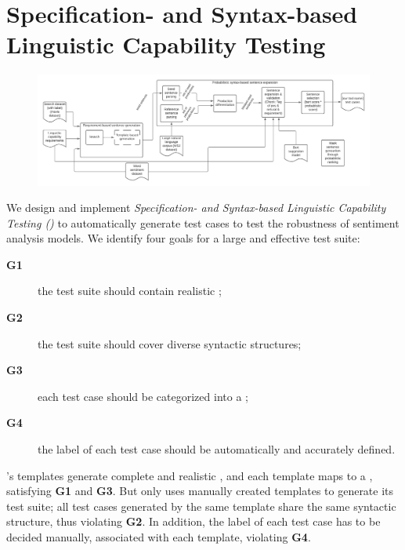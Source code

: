 \section{Specification- and Syntax-based Linguistic Capability Testing}

\begin{figure}
  \centering
  \includegraphics[width=\linewidth]{figs/overview.pdf}
  \caption{\OverviewFigCaption}
\end{figure}

  We design and implement
\emph{Specification- and Syntax-based Linguistic Capability Testing
  (\tool{})} to automatically generate test cases to test the
robustness of sentiment analysis models. We identify four goals for a
large and effective test suite:

\begin{description}
\item[{\bf G1}] the test suite should contain realistic \sents;
\item[{\bf G2}] the test suite should cover diverse syntactic structures;
  \item[{\bf G3}] each test case should be
categorized into a \lc;
\item[{\bf G4}] the label of each test case should be
automatically and accurately defined.
\end{description}

\Cklst's templates generate complete and realistic \sents, and each
template maps to a \lc, satisfying {\bf G1} and {\bf
  G3}. But \Cklst only uses  manually created templates to
generate its test suite; all test cases generated by the same template
share the same syntactic structure, thus violating {\bf G2}. In
addition, the label of each \Cklst test case has to be decided
manually, associated with each template, violating {\bf G4}.

